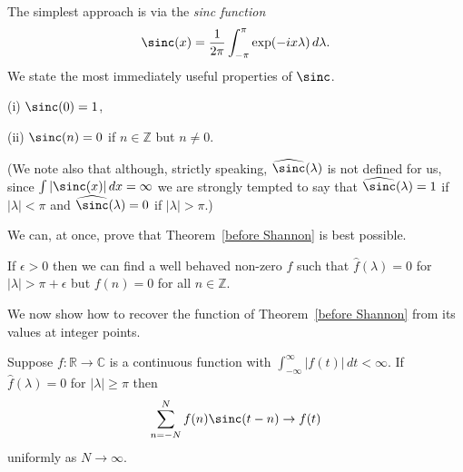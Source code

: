 The simplest approach is via the \emph{sinc function}
\[\sinc(x)=\frac{1}{2\pi}\int_{-\pi}^{\pi}\exp(-ix\lambda)\,d\lambda.\]
We state the most immediately useful properties
of  $\sinc$.
\begin{lemma}
(i) $\sinc(0)=1$,

(ii) $\sinc(n)=0$ if $n\in{\mathbb Z}$ but $n\neq 0$.
\end{lemma}

(We note also that although, strictly speaking,
$\widehat{\sinc}(\lambda)$ is not defined
for us, since $\int|\sinc (x)|\,dx=\infty$
we are strongly tempted to say that
$\widehat{\sinc}(\lambda)=1$ if $|\lambda|<\pi$
and
$\widehat{\sinc}(\lambda)=0$ if $|\lambda|>\pi$.)

We can, at once, prove that Theorem~\ref{before Shannon}
is best possible.
\begin{lemma}\label{Shannon best}
If $\epsilon>0$ then we can find a
well behaved non-zero $f$ such that
$\hat{f}(\lambda)=0$ for $|\lambda|>\pi+\epsilon$
but $f(n)=0$ for all $n\in{\mathbb Z}$.
\end{lemma}

We now show how to recover the function of
Theorem~\ref{before Shannon} from its values
at integer points.
\begin{theorem}\label{Shannon constructive}
Suppose $f:{\mathbb R}\rightarrow{\mathbb C}$
is a continuous function with
$\int_{-\infty}^{\infty}|f(t)|\,dt<\infty$.
If $\hat{f}(\lambda)=0$
for $|\lambda|\geq\pi$
then
\[\sum_{n=-N}^{N}f(n)\sinc(t-n)\rightarrow f(t)\]
uniformly as $N\rightarrow\infty$.
\end{theorem}

